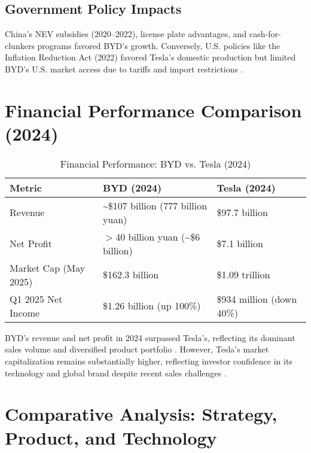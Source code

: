 \documentclass{article}
\begin{document}
\subsection{Government Policy Impacts}

China's NEV subsidies (2020--2022), license plate advantages, and cash-for-clunkers programs favored BYD's growth. Conversely, U.S. policies like the Inflation Reduction Act (2022) favored Tesla's domestic production but limited BYD's U.S. market access due to tariffs and import restrictions \citep{techresearchonline2024, ielp2024}.

\section{Financial Performance Comparison (2024)}

\begin{table}[ht]
\centering
\caption{Financial Performance: BYD vs. Tesla (2024)}
\label{tab:financials}
\begin{tabularx}{\textwidth}{l l l}
\toprule
Metric & BYD (2024) & Tesla (2024) \\
\midrule
Revenue & \textasciitilde\$107 billion (777 billion yuan) & \$97.7 billion \\
Net Profit & $>$40 billion yuan (\textasciitilde\$6 billion) & \$7.1 billion \\
Market Cap (May 2025) & \$162.3 billion & \$1.09 trillion \\
Q1 2025 Net Income & \$1.26 billion (up 100\%) & \$934 million (down 40\%) \\
\bottomrule
\end{tabularx}
\end{table}

BYD's revenue and net profit in 2024 surpassed Tesla's, reflecting its dominant sales volume and diversified product portfolio \citep{cnn2025, investors2025}. However, Tesla's market capitalization remains substantially higher, reflecting investor confidence in its technology and global brand despite recent sales challenges \citep{investors2025}.

\section{Comparative Analysis: Strategy, Product, and Technology}
\end{document}
